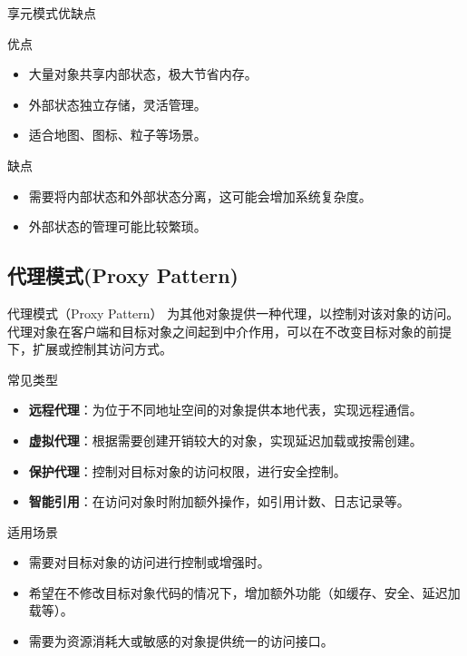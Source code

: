 \documentclass[UTF8,aspectratio=169]{beamer}
\begin{document}
\begin{frame}{享元模式优缺点}
    \begin{ytublock}{优点}
        \begin{itemize}
            \item 大量对象共享内部状态，极大节省内存。
            \item 外部状态独立存储，灵活管理。
            \item 适合地图、图标、粒子等场景。
        \end{itemize}
    \end{ytublock}
    \begin{alertytublock}{缺点}
        \begin{itemize}
            \item 需要将内部状态和外部状态分离，这可能会增加系统复杂度。
            \item 外部状态的管理可能比较繁琐。
        \end{itemize}
    \end{alertytublock}
\end{frame}

\subsection{代理模式(Proxy Pattern)}

\begin{frame}{代理模式（Proxy Pattern）}
    为其他对象提供一种代理，以控制对该对象的访问。
    代理对象在客户端和目标对象之间起到中介作用，可以在不改变目标对象的前提下，扩展或控制其访问方式。
    \begin{ytublock}{常见类型}
        \begin{itemize}
            \item \textbf{远程代理}：为位于不同地址空间的对象提供本地代表，实现远程通信。
            \item \textbf{虚拟代理}：根据需要创建开销较大的对象，实现延迟加载或按需创建。
            \item \textbf{保护代理}：控制对目标对象的访问权限，进行安全控制。
            \item \textbf{智能引用}：在访问对象时附加额外操作，如引用计数、日志记录等。
        \end{itemize}
    \end{ytublock}
    \begin{ytublock}{适用场景}
        \begin{itemize}
            \item 需要对目标对象的访问进行控制或增强时。
            \item 希望在不修改目标对象代码的情况下，增加额外功能（如缓存、安全、延迟加载等）。
            \item 需要为资源消耗大或敏感的对象提供统一的访问接口。
        \end{itemize}
    \end{ytublock}
\end{frame}
\end{document}
